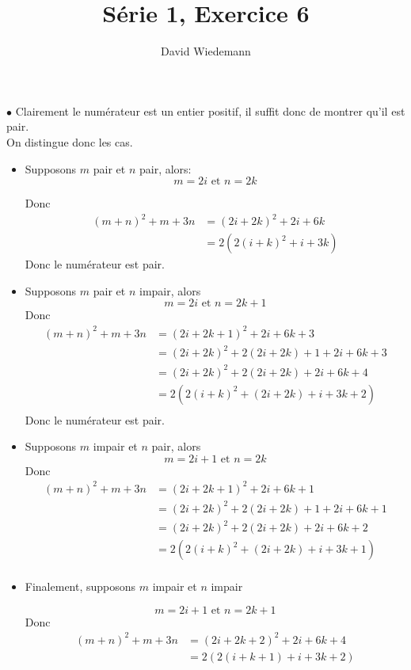 \documentclass[11pt, a4paper]{article}
\begin{document}
\title{Série 1, Exercice 6}
\author{David Wiedemann}
\maketitle
	$\bullet$ Clairement le numérateur est un entier positif, il suffit donc de montrer qu'il est pair.\\
		On distingue donc les cas.\\
		\begin{itemize}
			\item Supposons $m$ pair et $n$ pair, alors:
		\[ 
			m=2i \text{ et } n=2k
		\]

		
		Donc
		\begin{align*}
			( m+n)^{2} + m + 3n&= ( 2i+ 2k)^{2} + 2i + 6k\\
					   &= 2 ( 2 ( i+k)^2 + i + 3k)
		\end{align*}
		Donc le numérateur est pair.\\
	\item Supposons $m$ pair et $n$ impair, alors
		\[ 
			m = 2i \text{ et } n = 2k +1
		\]
		Donc 
		\begin{align*}
			( m+n)^{2} + m + 3n&= ( 2i+ 2k + 1)^{2} + 2i + 6k + 3\\
					   &= (2i + 2k)^{2} + 2(2i+ 2k) + 1 + 2i + 6k + 3\\
					   &= (2i + 2k)^{2} + 2(2i+ 2k)  + 2i + 6k + 4\\
					   &= 2( 2(i + k)^{2} + (2i+ 2k)  + i + 3k + 2 )\\
		\end{align*}
		Donc le numérateur est pair.\\
	\item Supposons $m$ impair et $n$ pair, alors
		\[ 
		m=2i + 1 \text{ et } n=2k
		\]
		Donc
		\begin{align*}
		( m+n)^{2} + m + 3n&= ( 2i+ 2k + 1)^{2} + 2i + 6k + 1\\
				&= (2i + 2k)^{2} + 2(2i+ 2k) + 1 + 2i + 6k + 1\\
				&= (2i + 2k)^{2} + 2(2i+ 2k) + 2i + 6k + 2\\
				&= 2( 2(i + k)^{2} + (2i+ 2k)  + i + 3k + 1 )\\
		\end{align*}
	\item Finalement, supposons $m$ impair et $n$ impair

		\[ 
			m=2i + 1 \text{ et } n=2k +1
		\]
		Donc
		\begin{align*}
		( m+n)^{2} + m + 3n&= ( 2i+ 2k + 2)^{2} + 2i + 6k + 4\\
				   &= 2 (2 ( i+k+1) + i + 3k +2)
		\end{align*}
		\end{itemize}
\end{document}
